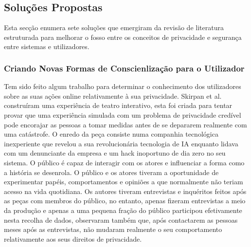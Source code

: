 \documentclass[conference]{IEEEtran}
\begin{document}
\subsection{Soluções Propostas}

\par
Esta secção enumera sete soluções que emergiram da revisão de literatura
estruturada para melhorar o fosso entre os conceitos de privacidade e segurança
entre sistemas e utilizadores.


\subsubsection{Criando Novas Formas de Conscienlização para o Utilizador}

Tem sido feito algum trabalho para determinar o conhecimento dos utilizadores
sobre as suas ações online relativamente à sua privacidade. Skirpan et al.
\cite{SkirpanPrivacy} construíram uma experiência de teatro interativo, esta
foi criada para tentar provar que uma experiência simulada com um problema
de privacidade credível pode encorajar as pessoas a tomar medidas antes de
se depararem realmente com uma catástrofe. O enredo da peça consiste numa
companhia tecnológica inexperiente que revelou a sua revolucionária tecnologia
de IA enquanto lidava com um denunciante da empresa e um hack inoportuno de
dia zero no seu sistema. O público é capaz de interagir com os atores e influenciar
a forma como a história se desenrola. O público e os atores tiveram a oportunidade
de experimentar papéis, comportamentos e opiniões a que normalmente não teriam
acesso na vida quotidiana. Os autores tiveram entrevistas e inquéritos feitos
após as peças com membros do público, no entanto, apenas fizeram entrevistas
a meio da produção e apenas a uma pequena fração do público participou efetivamente
nesta recolha de dados, observaram também que, após contactarem as pessoas
meses após as entrevistas, não mudaram realmente o seu comportamento relativamente
aos seus direitos de privacidade.
\end{document}
